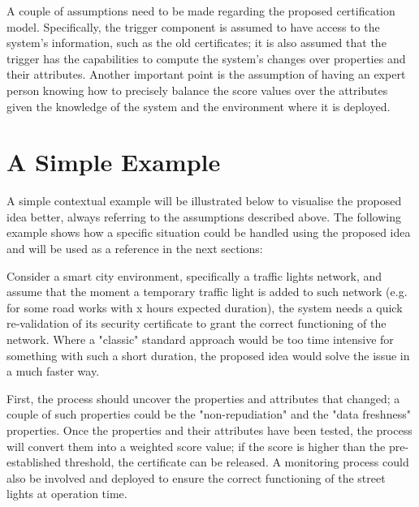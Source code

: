 A couple of assumptions need to be made regarding the proposed certification model. Specifically, the trigger component is assumed to have access to the system's information, such as the old certificates; it is also assumed that the trigger has the capabilities to compute the system's changes over properties and their attributes. Another important point is the assumption of having an expert person knowing how to precisely balance the score values over the attributes given the knowledge of the system and the environment where it is deployed.



\section{A Simple Example}
A simple contextual example will be illustrated below to visualise the proposed idea better, always referring to the assumptions described above. The following example shows how a specific situation could be handled using the proposed idea and will be used as a reference in the next sections:

Consider a smart city environment, specifically a traffic lights network, and assume that the moment a temporary traffic light is added to such network (e.g. for some road works with x hours expected duration), the system needs a quick re-validation of its security certificate to grant the correct functioning of the network. Where a "classic" standard approach would be too time intensive for something with such a short duration, the proposed idea would solve the issue in a much faster way. 

First, the process should uncover the properties and attributes that changed; a couple of such properties could be the "non-repudiation" and the "data freshness" properties. Once the properties and their attributes have been tested, the process will convert them into a weighted score value; if the score is higher than the pre-established threshold, the certificate can be released. A monitoring process could also be involved and deployed to ensure the correct functioning of the street lights at operation time.


